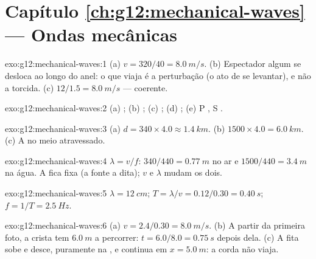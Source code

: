 \section*{Capítulo \ref{ch:g12:mechanical-waves} --- Ondas mecânicas}

\begin{solution}{exo:g12:mechanical-waves:1}
(a) $v = 320/40 = \qty{8.0}{m/s}$. (b) Espectador algum se desloca ao
longo do anel: o que viaja é a perturbação (o ato de se levantar), e não
a torcida. (c) $12/1.5 = \qty{8.0}{m/s}$ --- coerente.
\end{solution}

\begin{solution}{exo:g12:mechanical-waves:2}
(a) ; (b) ; (c) ; (d) ;
(e) P , S .
\end{solution}

\begin{solution}{exo:g12:mechanical-waves:3}
(a) $d = 340 \times 4.0 \approx \qty{1.4}{km}$.
(b) $1500 \times 4.0 = \qty{6.0}{km}$. (c) A  no
meio atravessado.
\end{solution}

\begin{solution}{exo:g12:mechanical-waves:4}
$\lambda = v/f$: $340/440 = \qty{0.77}{m}$ no ar e
$1500/440 = \qty{3.4}{m}$ na água. A  fica fixa (a fonte a
dita); $v$ e $\lambda$ mudam os dois.
\end{solution}

\begin{solution}{exo:g12:mechanical-waves:5}
$\lambda = \qty{12}{cm}$; $T = \lambda/v = 0.12/0.30 = \qty{0.40}{s}$;
$f = 1/T = \qty{2.5}{Hz}$.
\end{solution}

\begin{solution}{exo:g12:mechanical-waves:6}
(a) $v = 2.4/0.30 = \qty{8.0}{m/s}$. (b) A partir da primeira foto, a
crista tem $\qty{6.0}{m}$ a percorrer: $t = 6.0/8.0 = \qty{0.75}{s}$
depois dela. (c) A fita sobe e desce, puramente na , e
continua em $x = \qty{5.0}{m}$: a corda não viaja.
\end{solution}

